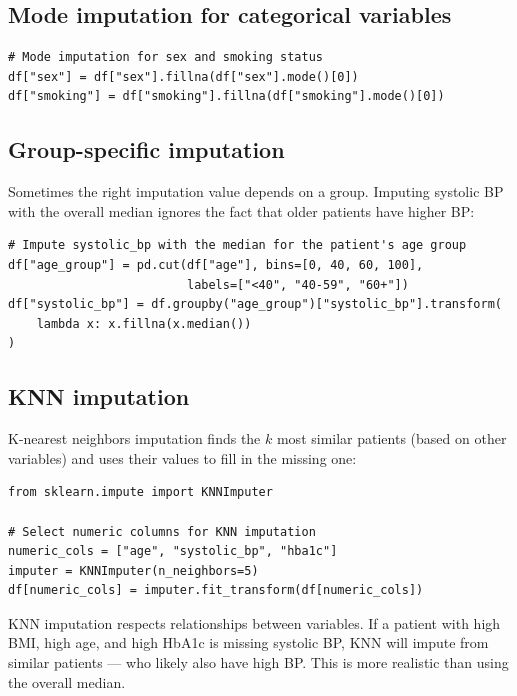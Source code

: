 \subsection{Mode imputation for categorical variables}

\begin{verbatim}
# Mode imputation for sex and smoking status
df["sex"] = df["sex"].fillna(df["sex"].mode()[0])
df["smoking"] = df["smoking"].fillna(df["smoking"].mode()[0])
\end{verbatim}

\subsection{Group-specific imputation}

Sometimes the right imputation value depends on a group. Imputing systolic BP with the overall median ignores the fact that older patients have higher BP:

\begin{verbatim}
# Impute systolic_bp with the median for the patient's age group
df["age_group"] = pd.cut(df["age"], bins=[0, 40, 60, 100],
                         labels=["<40", "40-59", "60+"])
df["systolic_bp"] = df.groupby("age_group")["systolic_bp"].transform(
    lambda x: x.fillna(x.median())
)
\end{verbatim}

\subsection{KNN imputation}

K-nearest neighbors imputation finds the $k$ most similar patients (based on other variables) and uses their values to fill in the missing one:

\begin{verbatim}
from sklearn.impute import KNNImputer

# Select numeric columns for KNN imputation
numeric_cols = ["age", "systolic_bp", "hba1c"]
imputer = KNNImputer(n_neighbors=5)
df[numeric_cols] = imputer.fit_transform(df[numeric_cols])
\end{verbatim}

\begin{pythontip}
KNN imputation respects relationships between variables. If a patient with high BMI, high age, and high HbA1c is missing systolic BP, KNN will impute from similar patients --- who likely also have high BP. This is more realistic than using the overall median.
\end{pythontip}

